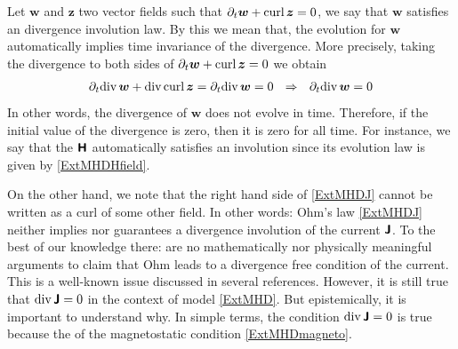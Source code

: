 \documentclass[preprint,1p]{elsarticle}
\begin{document}
\begin{remark}\label{Rem:NoInvolution}
Let $\boldsymbol{w}$ and $\boldsymbol{z}$ two vector fields such that
$\partial_t \boldsymbol{w} + \text{curl} \, \mathbf{}\boldsymbol{z} = 0$, we say that
$\boldsymbol{w}$ satisfies an divergence involution law. By this we mean that,
the evolution for $\boldsymbol{w}$ automatically implies time invariance of the
divergence. More precisely, taking the divergence to both sides of $\partial_t
\boldsymbol{w} + \text{curl} \, \mathbf{}\boldsymbol{z} = 0$ we obtain
\begin{align*}
\partial_t \text{div} \, \mathbf{}\boldsymbol{w}
+ \text{div} \, \mathbf{}\text{curl} \, \mathbf{}\boldsymbol{z} = \partial_t \text{div} \, \mathbf{}\boldsymbol{w} = 0 \ \
\Rightarrow  \ \ \partial_t \text{div} \, \mathbf{}\boldsymbol{w} = 0
\end{align*}
In other words, the divergence of $\boldsymbol{w}$ does not evolve in time.
Therefore, if the initial value of the divergence is zero, then it is zero for
all time. For instance, we say that the $\boldsymbol{\mathsf{H}}$ automatically satisfies an
involution since its evolution law is given by \eqref{ExtMHDHfield}.

On the other hand, we note that the right hand side of \eqref{ExtMHDJ}
cannot be written as a curl of some other field. In other words: Ohm's law
\eqref{ExtMHDJ} neither implies nor guarantees a divergence involution of the
current $\boldsymbol{\mathsf{J}}$. To the best of our knowledge there: are no mathematically
nor physically meaningful arguments to claim that Ohm leads to a divergence free
condition of the current. This is a well-known issue discussed in several
references. However, it is still true that $\text{div} \, \mathbf{}\boldsymbol{\mathsf{J}} = 0$ in the
context of model \eqref{ExtMHD}. But epistemically, it is important to
understand why. In simple terms, the condition $\text{div} \, \mathbf{}\boldsymbol{\mathsf{J}} = 0$ is true
because the of the magnetostatic condition \eqref{ExtMHDmagneto}.






\end{remark}
\end{document}
